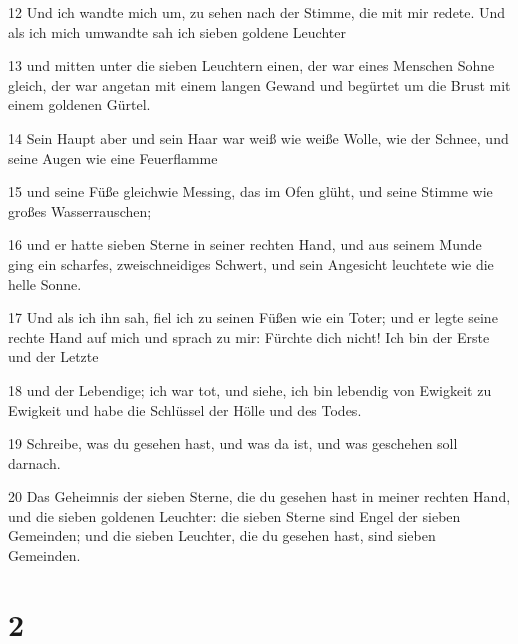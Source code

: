 \par 12 Und ich wandte mich um, zu sehen nach der Stimme, die mit mir redete. Und als ich mich umwandte sah ich sieben goldene Leuchter
\par 13 und mitten unter die sieben Leuchtern einen, der war eines Menschen Sohne gleich, der war angetan mit einem langen Gewand und begürtet um die Brust mit einem goldenen Gürtel.
\par 14 Sein Haupt aber und sein Haar war weiß wie weiße Wolle, wie der Schnee, und seine Augen wie eine Feuerflamme
\par 15 und seine Füße gleichwie Messing, das im Ofen glüht, und seine Stimme wie großes Wasserrauschen;
\par 16 und er hatte sieben Sterne in seiner rechten Hand, und aus seinem Munde ging ein scharfes, zweischneidiges Schwert, und sein Angesicht leuchtete wie die helle Sonne.
\par 17 Und als ich ihn sah, fiel ich zu seinen Füßen wie ein Toter; und er legte seine rechte Hand auf mich und sprach zu mir: Fürchte dich nicht! Ich bin der Erste und der Letzte
\par 18 und der Lebendige; ich war tot, und siehe, ich bin lebendig von Ewigkeit zu Ewigkeit und habe die Schlüssel der Hölle und des Todes.
\par 19 Schreibe, was du gesehen hast, und was da ist, und was geschehen soll darnach.
\par 20 Das Geheimnis der sieben Sterne, die du gesehen hast in meiner rechten Hand, und die sieben goldenen Leuchter: die sieben Sterne sind Engel der sieben Gemeinden; und die sieben Leuchter, die du gesehen hast, sind sieben Gemeinden.

\chapter{2}

